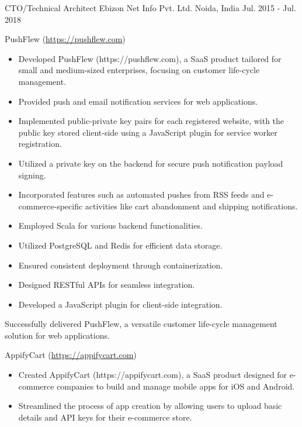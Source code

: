 \begin{cventries}
  \cventry
    {CTO/Technical Architect} %
    {Ebizon Net Info Pvt. Ltd.} %
    {Noida, India} %
    {Jul. 2015 - Jul. 2018} %
    {
      \begin{cvitems} %
        \item{PushFlew (\href{https://pushflew.com}{https://pushflew.com})}
        \begin{itemize}
        \item Developed PushFlew (https://pushflew.com), a SaaS product tailored for small and medium-sized enterprises, focusing on customer life-cycle management.
        \item Provided push and email notification services for web applications.
        \item Implemented public-private key pairs for each registered website, with the public key stored client-side using a JavaScript plugin for service worker registration.
        \item Utilized a private key on the backend for secure push notification payload signing.
        \item Incorporated features such as automated pushes from RSS feeds and e-commerce-specific activities like cart abandonment and shipping notifications.
        \item Employed Scala for various backend functionalities.
        \item Utilized PostgreSQL and Redis for efficient data storage.
        \item Ensured consistent deployment through containerization.
        \item Designed RESTful APIs for seamless integration.
        \item Developed a JavaScript plugin for client-side integration.
      \end{itemize}
        Successfully delivered PushFlew, a versatile customer life-cycle management solution for web applications.
        \item{AppifyCart (\href{https://appifycart.com}{https://appifycart.com})}
        \begin{itemize}
          \item Created AppifyCart (https://appifycart.com), a SaaS product designed for e-commerce companies to build and manage mobile apps for iOS and Android.
          \item Streamlined the process of app creation by allowing users to upload basic details and API keys for their e-commerce store.

\end{itemize}
\end{cvitems}}
\end{cventries}
